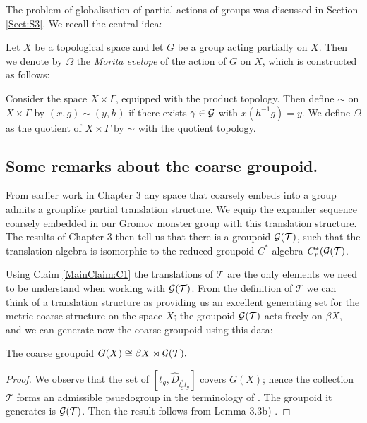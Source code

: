 \begin{example}
The problem of globalisation of partial actions of groups was discussed in Section \ref{Sect:S3}. We recall the central idea:
\begin{definition}
Let $X$ be a topological space and let $G$ be a group acting partially on $X$. Then we denote by $\Omega$ the \textit{Morita evelope} of the action of $G$ on $X$, which is constructed as follows:

Consider the space $X\times \Gamma$, equipped with the product topology. Then define $\sim$ on $X\times \Gamma$ by $(x,g)\sim (y,h)$ if there exists $\gamma \in \mathcal{G}$ with $x(h^{-1}g)=y$. We define $\Omega$ as the quotient of $X\times \Gamma$ by $\sim$ with the quotient topology. 
\end{definition}

\subsection{Some remarks about the coarse groupoid.}

From earlier work in Chapter 3 any space that coarsely embeds into a group admits a grouplike partial translation structure. We equip the expander sequence coarsely embedded in our Gromov monster group with this translation structure. The results of Chapter 3 then tell us that there is a groupoid $\mathcal{G}(\mathcal{T})$, such that the translation algebra is isomorphic to the reduced groupoid  $C^{*}$-algebra $C^{*}_{r}(\mathcal{G}(\mathcal{T})$. 

Using Claim \ref{MainClaim:C1} the translations of $\mathcal{T}$ are the only elements we need to be understand when working with $\mathcal{G}(\mathcal{T})$. From the definition of $\mathcal{T}$ we can think of a translation structure as providing us an excellent generating set for the metric coarse structure on the space $X$; the groupoid $\mathcal{G}(\mathcal{T})$ acts freely on $\beta X$, and we can generate now the coarse groupoid using this data:

\begin{lemma}\label{Lem:CG}
The coarse groupoid $G(X) \cong \beta X \rtimes \mathcal{G}(\mathcal{T}).$
\end{lemma}
\begin{proof}
We observe that the set of $[t_{g},\widehat{D}_{t_{g}^{*}t_{g}}]$ covers $G(X)$; hence the collection $\mathcal{T}$ forms an admissible psuedogroup in the terminology of \cite{MR1905840}. The groupoid it generates is $\mathcal{G}(\mathcal{T})$. Then the result follows from Lemma 3.3b) \cite{MR1905840}.
\end{proof}


\end{example}
